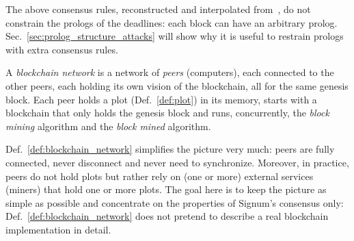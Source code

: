 %
The above consensus rules, reconstructed and interpolated
from~\cite{SignumPlotting,SignumSource},
do not constrain the prologs of the deadlines:
each block can have an arbitrary prolog. Sec.~\ref{sec:prolog_structure_attacks}
will show why it is useful to restrain prologs with extra consensus rules.
%
\begin{definition}\label{def:blockchain_network}
  A \emph{blockchain network} is a
  network of \emph{peers} (computers), each connected to the other peers,
  each holding its own vision of the blockchain, all for the same genesis block.
  Each peer holds a plot (Def.~\ref{def:plot}) in its memory, starts with
  a blockchain that only holds the genesis block and runs,
  concurrently, the \emph{block mining} algorithm
  and the \emph{block mined} algorithm.
\end{definition}
%
Def.~\ref{def:blockchain_network} simplifies the picture very much:
peers are fully connected, never disconnect and never need to synchronize.
Moreover, in practice, peers do not hold plots but rather rely on (one or more)
external services (miners) that hold one or more plots.
The goal here is to keep the picture as simple as possible and concentrate on the properties of
Signum's consensus only: Def.~\ref{def:blockchain_network} does not pretend
to describe a real blockchain implementation in detail.

